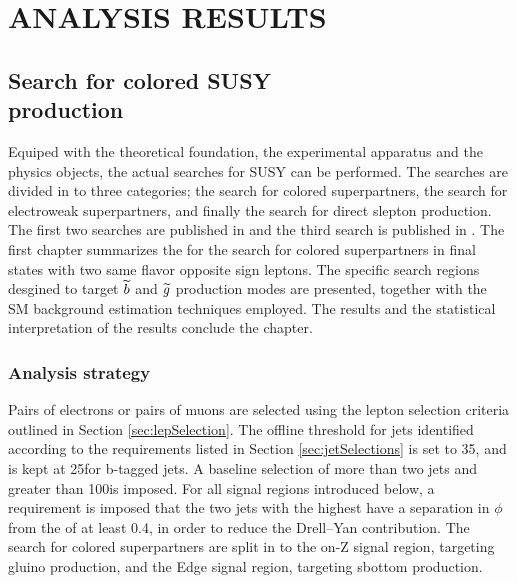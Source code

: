 \part{ANALYSIS RESULTS}
\chapter{Search for colored SUSY\\ production}\label{sec:strong}
\noindent\justify
Equiped with the theoretical foundation, the experimental apparatus and the physics objects, the actual searches for SUSY can be performed.
The searches are divided in to three categories; the search for colored superpartners, the search for electroweak superpartners, and finally the search for direct slepton production. 
The first two searches are published in \cite{Sirunyan:2017qaj} and the third search is published in \cite{Sirunyan:2018nwe}.  
\newpara
\noindent\justify
The first chapter summarizes the for the search for colored superpartners in final states with two same flavor opposite sign leptons. 
The specific search regions desgined to target $\widetilde{b}$ and $\widetilde{g}$ production modes are presented, together with the SM background estimation techniques employed. 
The results and the statistical interpretation of the results conclude the chapter. 
\newpage
\section{Analysis strategy}
\noindent
\justify
Pairs of electrons or pairs of muons are selected using the lepton selection criteria outlined in Section \ref{sec:lepSelection}.  
The offline \pt threshold for jets identified according to the requirements listed in Section \ref{sec:jetSelections} is set to 35\GeV, and is kept at 25\GeV for b-tagged jets.
A baseline selection of more than two jets and \ptmiss greater than 100\GeV is imposed. 
For all signal regions introduced below, a requirement is imposed that the two jets with the highest \pt have a separation in $\phi$ from the \ptmiss of at least 0.4, in order to reduce the Drell--Yan contribution.
The search for colored superpartners are split in to the on-Z signal region, targeting gluino production, and the Edge signal region, targeting sbottom production.
